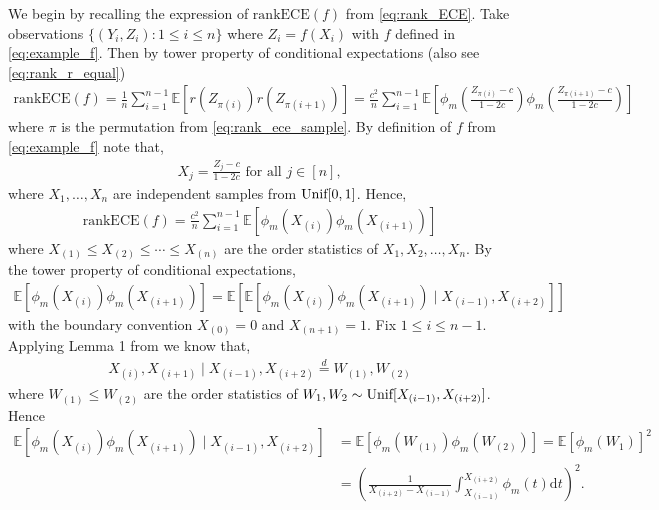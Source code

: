 \documentclass[11pt]{article}
\numberwithin{equation}{section}
\theoremstyle{definition}
\newcommand{\E}{\mathbb{E}}
\newcommand{\rankECE}{\mathrm{rankECE}}
\newcommand{\rmd}{\mathrm{d}}
\begin{document}
We begin by recalling the expression of $\rankECE(f)$ from \eqref{eq:rank_ECE}. Take observations $\{(Y_i, Z_i): 1\leq i\leq n\}$ where $Z_i = f(X_i)$ with $f$ defined in \eqref{eq:example_f}. Then by tower property of conditional expectations (also see \eqref{eq:rank_r_equal})
\begin{align*}
    \rankECE(f) = \frac{1}{n}\sum_{i=1}^{n-1}\E\left[r\left(Z_{\pi(i)}\right)r\left(Z_{\pi(i+1)}\right)\right] = \frac{c^2}{n}\sum_{i=1}^{n-1}\E\left[\phi_m\left(\frac{Z_{\pi(i)}-c}{1-2c}\right)\phi_m\left(\frac{Z_{\pi(i+1)}-c}{1-2c}\right)\right]
\end{align*}
where $\pi$ is the permutation from \eqref{eq:rank_ece_sample}. By definition of $f$ from \eqref{eq:example_f} note that,
\begin{align*}
    X_j = \frac{Z_j-c}{1-2c}\text{ for all }j \in [n],
\end{align*}
where $X_1,\ldots, X_n$ are independent samples from $\textnormal{Unif}[0,1]$. Hence,
\begin{align*}
    \rankECE(f) = \frac{c^2}{n}\sum_{i=1}^{n-1}\E\left[\phi_m\left(X_{(i)}\right)\phi_m\left(X_{(i+1)}\right)\right]
\end{align*}
where $X_{(1)}\leq X_{(2)}\leq \cdots\leq X_{(n)}$ are the order statistics of $X_1, X_2,\ldots, X_n$. By the tower property of conditional expectations,
\begin{align}\label{eq:example_ub_tower}
    \E\left[\phi_m\left(X_{(i)}\right)\phi_m\left(X_{(i+1)}\right)\right] = \E\left[\E\left[\phi_m\left(X_{(i)}\right)\phi_m\left(X_{(i+1)}\right) \mid X_{(i-1)}, X_{(i+2)}\right]\right]
\end{align}
with the boundary convention $X_{(0)} = 0$ and $X_{(n+1)} = 1$. Fix $1\leq i\leq n-1$. Applying Lemma 1 from \cite{gupta2021distribution} we know that,
\begin{align*}
    X_{(i)}, X_{(i+1)}\mid X_{(i-1)}, X_{(i+2)} \overset{d}{=} W_{(1)}, W_{(2)}
\end{align*}
where $W_{(1)}\leq W_{(2)}$ are the order statistics of $W_1, W_2\sim \textnormal{Unif}[X_{(i-1)}, X_{(i+2)}]$. Hence
\begin{align}\label{eq:example_cond_exp_bd_1}
    \E\left[\phi_m\left(X_{(i)}\right)\phi_m\left(X_{(i+1)}\right) \mid X_{(i-1)}, X_{(i+2)}\right] 
    & = \E\left[\phi_m(W_{(1)})\phi_m(W_{(2)})\right] = \E\left[\phi_m(W_1)\right]^2\nonumber\\
    & = \left(\frac{1}{X_{(i+2)} - X_{(i-1)}}\int_{X_{(i-1)}}^{X_{(i+2)}}\phi_m(t)\rmd t\right)^2.
\end{align}
\end{document}
